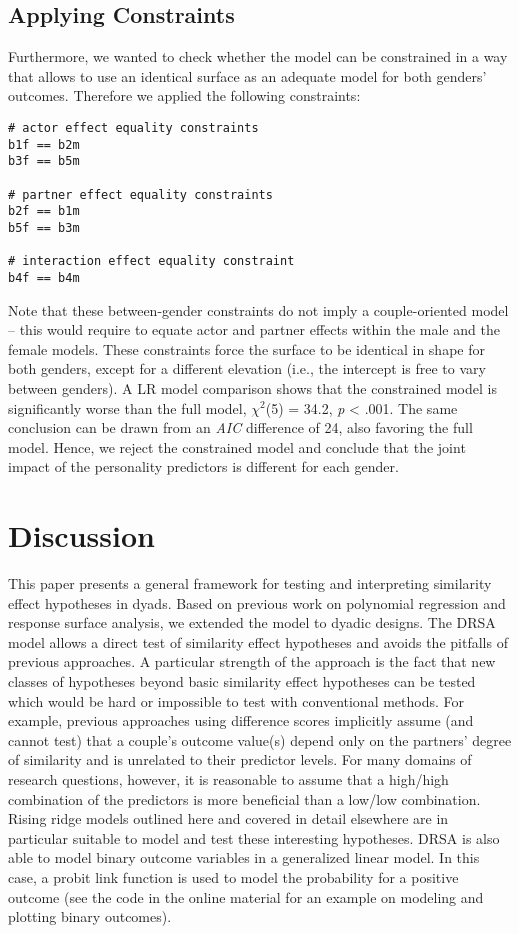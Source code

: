 \documentclass[jou,a4paper,draftfirst]{apa6}
\newcommand{\added}[1]{#1}
\begin{document}
\subsection{Applying Constraints}
Furthermore, we wanted to check whether the model can be constrained in a way that allows to use an identical surface as an adequate model for both genders' outcomes. Therefore we applied the following constraints:

\begin{lstlisting}
# actor effect equality constraints
b1f == b2m
b3f == b5m

# partner effect equality constraints
b2f == b1m
b5f == b3m

# interaction effect equality constraint
b4f == b4m
\end{lstlisting}

\added{Note that these between-gender constraints do not imply a couple-oriented model -- this would require to equate actor and partner effects within the male and the female models.} These constraints force the surface to be identical in shape for both genders, except for a different elevation (i.e., the intercept is free to vary between genders). A LR model comparison shows that the constrained model is significantly worse than the full model, $\chi^2$(5) = 34.2, \textit{p} < .001. The same conclusion can be drawn from an \emph{AIC} difference of 24, also favoring the full model. Hence, we reject the constrained model and conclude that the joint impact of the personality predictors is different for each gender. 



\section{Discussion}
This paper presents a general framework for testing and interpreting similarity effect hypotheses in dyads. Based on previous work on polynomial regression and response surface analysis, we extended the model to dyadic designs. The DRSA model allows a direct test of similarity effect hypotheses and avoids the pitfalls of previous approaches. A particular strength of the approach is the fact that new classes of hypotheses beyond basic similarity effect hypotheses can be tested which would be hard or impossible to test with conventional methods. For example, previous approaches using difference scores implicitly assume (and cannot test) that a couple's outcome value(s) depend only on the partners' degree of similarity and is unrelated to their predictor levels. For many domains of research questions, however, it is reasonable to assume that a high/high combination of the predictors is more beneficial than a low/low combination. Rising ridge models outlined here and covered in detail elsewhere \parencite{schonbrodt_testing_2016} are in particular suitable to model and test these interesting hypotheses. DRSA is also able to model binary outcome variables in a generalized linear model. In this case, a probit link function is used to model the probability for a positive outcome (see the code in the online material for an example on modeling and plotting binary outcomes).
\end{document}

